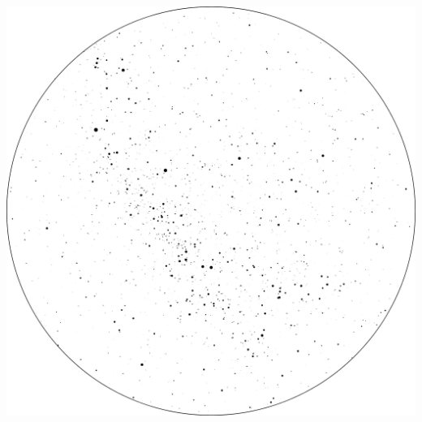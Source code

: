\documentclass{SAS-class-skygen}
\begin{document}
	\vspace{0.5cm}
    \begin{center}
    \includegraphics[width=\textwidth]{./pics/sky_chart13.png}
    \end{center}
    
    
\end{document}
